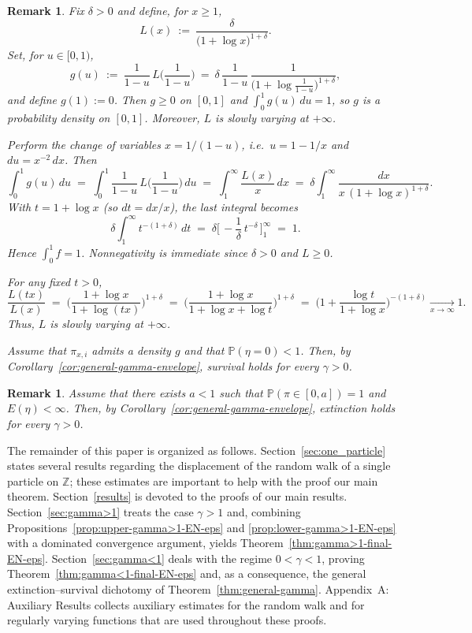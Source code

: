 \documentclass[preprint]{imsart}
\newcommand{\PP}{\mathbb{P}}
\newcommand{\1}{\mathbf{1}}
\theoremstyle{plain}
\newtheorem{remark}[theorem]{Remark}
\theoremstyle{definition}
\begin{document}
\begin{remark}
Fix $\delta>0$ and define, for $x\ge 1$,
\[
L(x)\ :=\ \frac{\delta}{\bigl(1+\log x\bigr)^{1+\delta}}.
\]
Set, for $u\in[0,1)$,
\[
g(u)\ :=\ \frac{1}{1-u}\,L\!\Big(\frac{1}{1-u}\Big)
\ =\ \delta\,\frac{1}{1-u}\,\frac{1}{\bigl(1+\log \tfrac{1}{1-u}\bigr)^{1+\delta}},
\]
and define $g(1):=0$. Then $g\ge 0$ on $[0,1]$ and $\int_0^1 g(u)\,du=1$, so $g$ is a probability density on $[0,1]$. Moreover, $L$ is slowly varying at $+\infty$.

Perform the change of variables $x=1/(1-u)$, i.e.\ $u=1-1/x$ and $du=x^{-2}\,dx$. Then
\[
\int_0^1 g(u)\,du
\;=\;\int_0^1 \frac{1}{1-u}\,L\!\Big(\frac{1}{1-u}\Big)\,du
\;=\;\int_{1}^{\infty} \frac{L(x)}{x}\,dx
\;=\;\delta\int_{1}^{\infty} \frac{dx}{x\,(1+\log x)^{1+\delta}}.
\]
With $t=1+\log x$ (so $dt=dx/x$), the last integral becomes
\[
\delta\int_{1}^{\infty} t^{-(1+\delta)}\,dt
\;=\;\delta\Big[\,-\frac{1}{\delta}\,t^{-\delta}\,\Big]_{1}^{\infty}
\;=\;1.
\]
Hence $\int_0^1 f=1$. Nonnegativity is immediate since $\delta>0$ and $L\ge 0$.

For any fixed $t>0$,
\[
\frac{L(tx)}{L(x)}
\;=\;\Bigg(\frac{1+\log x}{1+\log(tx)}\Bigg)^{1+\delta}
\;=\;\Bigg(\frac{1+\log x}{1+\log x+\log t}\Bigg)^{1+\delta}
\;=\;\Bigg(1+\frac{\log t}{1+\log x}\Bigg)^{-(1+\delta)}
\xrightarrow[x\to\infty]{}1.
\]
Thus, $L$ is slowly varying at $+\infty$.

Assume that $\pi_{x,i}$ admits a density $g$ and that $\mathbb{P}(\eta=0)<1$. Then, by Corollary~\ref{cor:general-gamma-envelope}, survival holds for every $\gamma>0$.


\end{remark}








\begin{remark}
Assume that there exists $a<1$ such that $\PP(\pi\in[0,a])=1$ and $E(\eta)<\infty$. Then, by Corollary~\ref{cor:general-gamma-envelope}, extinction holds for every $\gamma>0$.
\end{remark}


The remainder of this paper is organized as follows. Section~\ref{sec:one_particle} states several results regarding the displacement of the random walk of a single particle on $\mathbb{Z}$; these estimates are important to help with the proof our main theorem. Section~\ref{results} is devoted to the proofs of our main results.
Section~\ref{sec:gamma>1} treats the case $\gamma>1$ and, combining
Propositions~\ref{prop:upper-gamma>1-EN-eps} and \ref{prop:lower-gamma>1-EN-eps}
with a dominated convergence argument, yields Theorem~\ref{thm:gamma>1-final-EN-eps}.
Section~\ref{sec:gamma<1} deals with the regime $0<\gamma<1$, proving
Theorem~\ref{thm:gamma<1-final-EN-eps} and, as a consequence, the general
extinction–survival dichotomy of Theorem~\ref{thm:general-gamma}.
Appendix~A: Auxiliary Results collects auxiliary estimates for the random walk
and for regularly varying functions that are used throughout these proofs.
\end{document}
